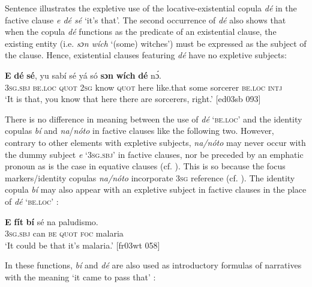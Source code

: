 Sentence  illustrates the expletive use of the locative-existential copula \textit{dé} in the factive clause \textit{e dé sé} ‘it’s that’. The second occurrence of \textit{dé} also shows that when the copula \textit{dé} functions as the predicate of an existential clause, the existing entity (i.e. \textit{sɔn wích} ‘(some) witches’) must be expressed as the subject of the clause. Hence, existential clauses featuring \textit{dé} have no expletive subjects: 



\ea%
    \label{ex:key:1133}
    \gll \textbf{E}    \textbf{dé}    \textbf{sé},    yu  sabí    sé    yá    só
\textbf{sɔn}    \textbf{wích}    \textbf{dé}    nɔ́.\\
\textsc{3sg.sbj}  \textsc{be.loc}  \textsc{quot}    \textsc{2sg}  know  \textsc{quot}    here    like.that
some  sorcerer    \textsc{be.loc}  \textsc{intj}\\

\glt ‘It is that, you know that here there are sorcerers, right.’ [ed03sb 093]
\z

There is no difference in meaning between the use of \textit{dé} \textsc{‘be.loc’} and the identity copulas \textit{bí} and \textit{na}/\textit{nóto} in factive clauses like the following two. However, contrary to other elements with expletive subjects, \textit{na}\textit{\textup{/}}\textit{nóto} may never occur with the dummy subject \textit{e} ‘\textsc{3sg.sbj}’ in factive clauses, nor be preceded by an emphatic pronoun as is the case in equative clauses (cf. ). This is so because the focus markers/identity copulas \textit{na}\textit{\textup{/}}\textit{nóto} incorporate \textsc{3sg} reference (cf. ). The identity copula \textit{bí} may also appear with an expletive subject in factive clauses in the place of \textit{dé} ‘\textsc{be.loc}’ :


\ea%
    \label{ex:key:1134}
    \gll \textbf{E}    \textbf{fít}  \textbf{bí}  sé    na  paludismo.\\
\textsc{3sg.sbj}  can  \textsc{be}  \textsc{quot}    \textsc{foc}  malaria\\

\glt ‘It could be that it’s malaria.’ [fr03wt 058]
\z

In these functions, \textit{bí} and \textit{dé} are also used as introductory formulas of narratives with the meaning ‘it came to pass that’ :


